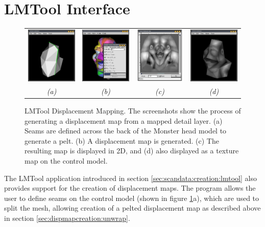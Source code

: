 \section{\label{sec:dispmapcreation:lmtool}LMTool Interface}
\begin{figure}
\begin{center}
\begin{tabular}{cccc}
\includegraphics[width=3.5cm]{../images/lmtool_pelting} &
\includegraphics[width=3.5cm]{../images/lmtool_dispmapdialog} &
\includegraphics[width=3.5cm]{../images/lmtool_dispmap} &
\includegraphics[width=3.5cm]{../images/lmtool_dispmaptexture} \\
{\it(a)} & {\it(b)} & {\it(c)} & {\it(d)} 
\end{tabular}
\caption[LMTool Displacement Mapping]{\label{fig:lmtooldispmap} LMTool Displacement Mapping. The screenshots show the process of generating a displacement map from a mapped detail layer. (a) Seams are defined across the back of the Monster head model to generate a pelt. (b) A displacement map is generated. (c) The resulting map is displayed in 2D, and (d) also displayed as a texture map on the control model.}
\end{center}
\end{figure}
The LMTool application introduced in section \ref{sec:scandata:creation:lmtool} also provides support for the creation of displacement maps. The program allows the user to define seams on the control model (shown in figure \ref{fig:lmtooldispmap}a), which are used to split the mesh, allowing creation of a pelted displacement map as described above in section \ref{sec:dispmapcreation:unwrap}.

